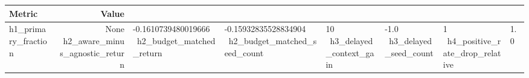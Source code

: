 \begin{tabular}{lr}
\hline
Metric & Value \\
\hline
h1\_primary\_fraction & None \
h2\_aware\_minus\_agnostic\_return & -0.1610739480019666 \
h2\_budget\_matched\_return & -0.15932835528834904 \
h2\_budget\_matched\_seed\_count & 10 \
h3\_delayed\_context\_gain & -1.0 \
h3\_delayed\_seed\_count & 1 \
h4\_positive\_rate\_drop\_relative & 1.0 \
\hline
\end{tabular}
